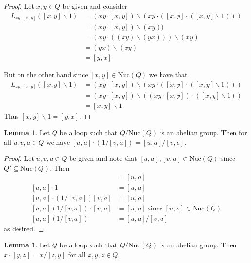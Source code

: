 \documentclass[12pt]{report}
\theoremstyle{definition}
\newtheorem{lem}[thm]{Lemma}
\newcommand{\ldv}{\backslash}       %
\newcommand{\rdv}{/}                %
\newcommand{\nuc}{\text{Nuc}}       %
\begin{document}
\begin{proof}
  Let $x, y\in Q$ be given and consider
  \begin{align*}
    L_{xy, [x, y]} ([x, y]\ldv 1) &= (xy\cdot [x, y])\ldv(xy\cdot ([x, y]\cdot([x, y]\ldv 1)))\\
    &= (xy\cdot [x, y])\ldv (xy))\\
    &= (xy\cdot ((xy)\ldv (yx)))\ldv (xy)\\
    &= (yx)\ldv (xy)\\
    &= [y, x]
  \end{align*}

  But on the other hand since $[x, y]\in\nuc(Q)$ we have that
  \begin{align*}
    L_{xy, [x, y]}([x, y]\ldv 1) &= (xy\cdot [x, y])\ldv (xy\cdot ([x, y]\cdot([x, y]\ldv 1)))\\
    &= (xy\cdot [x, y])\ldv ((xy\cdot [x, y])\cdot ([x, y]\ldv 1))\\
    &= [x, y]\ldv 1
  \end{align*}
  Thus $[x, y]\ldv 1 = [y, x]$.
\end{proof}

\begin{lem}\label{lem-2}
  Let $Q$ be a loop such that $Q/\nuc(Q)$ is an abelian group. Then for all $u, v, a\in Q$ we have
    $[u, a]\cdot(1\rdv [v, a]) = [u, a]\rdv [v, a]$.
\end{lem}

\begin{proof}
  Let $u, v, a\in Q$ be given and note that $[u, a], [v, a]\in\nuc(Q)$ since $Q'\subseteq \nuc(Q)$. Then
  \begin{align*}
    [u, a] &= [u, a]\\
    [u, a]\cdot 1 &= [u, a]\\
    [u, a]\cdot (1\rdv [v, a])[v, a] &= [u, a]\\
    [u, a](1\rdv [v, a])\cdot [v, a] &= [u, a]\text{ since $[u, a]\in\nuc(Q) $}\\
    [u, a](1\rdv [v, a]) &= [u, a]\rdv[v,a]
  \end{align*}
  as desired.
\end{proof}

\begin{lem}\label{lem-3}
  Let $Q$ be a loop such that $Q/\nuc(Q)$ is an abelian group. Then $x\cdot [y, z] = x\rdv [z, y]$
    for all $x, y, z\in Q$.
\end{lem}
\end{document}
